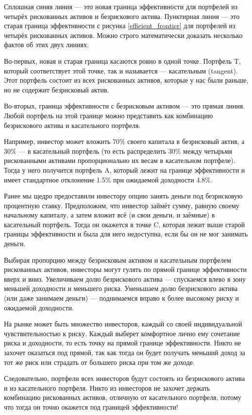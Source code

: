 Сплошная синяя линия --- это новая граница эффективности для портфелей из четырёх рискованных активов и безрискового актива. Пунктирная линия --- это старая граница эффективности с рисунка \ref{efficient_frontier} для портфелей из четырёх рискованных активов. Можно строго математически доказать несколько фактов об этих двух линиях.

Во-первых, новая и старая граница касаются ровно в одной точке. Портфель T, который соответствует этой точке, так и называется --- касательным (tangent). Этот портфель состоит из всех рискованных активов, которые у нас были раньше, но не содержит безрисковый актив.

Во-вторых, граница эффективности с безрисковым активом --- это прямая линия. Любой портфель на этой границе можно представить как комбинацию безрискового актива и касательного портфеля.

Например, инвестор может вложить 70\% своего капитала в безрисковый актив, а 30\% --- в касательный портфель (то есть распределить 30\% между четырьмя рискованными активами пропорционально их весам в касательном портфеле). Тогда у него получится портфель A, который лежит на границе эффективности и имеет стандартное отклонение 1.5\% при ожидаемой доходности 4.8\%.

Ранее мы щедро предоставили инвестору опцию занять деньги под безрисковую процентную ставку. Предположим, что инвестор займёт сумму, равную своему начальному капиталу, а затем вложит всё (и свои деньги, и заёмные) в касательный портфель. Тогда он окажется в точке C, которая лежит выше старой границы эффективности и была для него недоступна, если бы он не мог занимать деньги.

Выбирая пропорцию между безрисковым активом и касательным портфелем рискованных активов, инвесторы могут гулять по прямой границе эффективности вверх и вниз. Увеличиваем долю безрискового актива --- спускаемся влево в зону меньшей доходности и меньшего риска. Уменьшаем долю безрискового актива (или даже занимаем деньги) --- поднимаемся вправо к более высокому риску и ожидаемой доходности. 

На рынке может быть множество инвесторов, каждый со своей индивидуальной чувствительностью к риску. Каждый выберет комфортное лично ему сочетание риска и доходности, то есть точку на прямой границе эффективности. Никто не захочет оказаться под прямой, так как тогда он будет получать меньший доход за тот же риск или страдать от большего риска при том же доходе.

Следовательно, портфели всех инвесторов будут состоять из безрискового актива и из касательного портфеля. Никто из инвесторов не захочет держать комбинацию рискованных активов, отличную от касательного портфеля, потому что тогда он точно окажется под границей эффективности!

